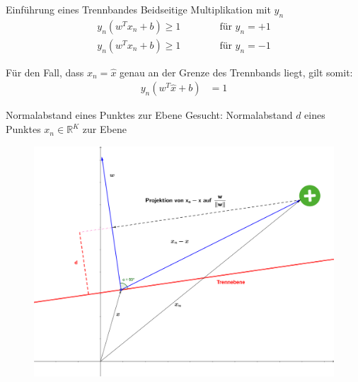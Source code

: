 \documentclass[ngerman]{beamer}
\begin{document}
\begin{frame}{Einführung eines Trennbandes}
	Beidseitige Multiplikation mit $y_{n}$
	\begin{subequations}
		\begin{alignat*}{2}
			y_{n} (w^{T} x_{n} + b) \geq 1 & \qquad & \text{ für } y_{n} = +1\\
			y_{n} (w^{T} x_{n} + b) \geq 1 & & \text{ für } y_{n} = -1
		\end{alignat*}
	\end{subequations}

	\pause 
	Für den Fall, dass $x_{n} = \hat{x}$ genau an der Grenze des Trennbands liegt, gilt somit:
	\begin{equation}
		\begin{aligned}
			y_{n} (w^{T} \hat{x} + b) &= 1
		\end{aligned}
	\end{equation}
\end{frame}



\begin{frame}{Normalabstand eines Punktes zur Ebene}
	Gesucht: Normalabstand $d$ eines Punktes $x_{n} \in \mathbb{R}^{K}$ zur Ebene \\
	
	\begin{center}
		\begin{figure}
			\includegraphics[width=\textwidth,height=0.8\textheight,keepaspectratio]{assets/projection.png}
		\end{figure}
	\end{center}
\end{frame}
\end{document}

